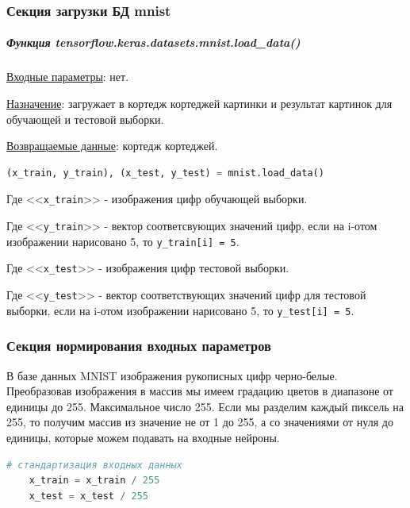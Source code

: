 \subsubsection{Секция загрузки БД mnist}

\subparagraph{Функция tensorflow.keras.datasets.mnist.load\_data()} \hspace{0pt}

\underline{Входные параметры}: нет.

\underline{Назначение}: загружает в кортедж кортеджей картинки и результат картинок для обучающей и тестовой выборки.

\underline{Возвращаемые данные}: кортедж кортеджей.

\begin{lstlisting}[language=Python,]
    (x_train, y_train), (x_test, y_test) = mnist.load_data()
\end{lstlisting}

Где <<\verb|x_train|>> - изображения цифр обучающей выборки.

Где <<\verb|у_train|>> - вектор соответсвующих значений цифр,
если на i-отом изображении нарисовано 5, то \verb|y_train[i] = 5|.

Где <<\verb|x_test|>> - изображения цифр тестовой выборки.

Где <<\verb|у_test|>> - вектор соответствующих значений цифр для тестовой выборки,
если на i-отом изображении нарисовано 5, то \verb|y_test[i] = 5|.



\subsubsection{Секция нормирования входных параметров}

В базе данных MNIST изображения рукописных цифр черно-белые. Преобразовав изображения в массив мы имеем градацию цветов в диапазоне от единицы до 255. Максимальное число 255. Если мы разделим каждый пиксель на 255, то получим массив из значение не от 1 до 255, а со значениями от нуля до единицы, которые можем подавать на входные нейроны.

\begin{lstlisting}[language=Python,]
    # стандартизация входных данных
    x_train = x_train / 255
    x_test = x_test / 255
\end{lstlisting}



\newpage



